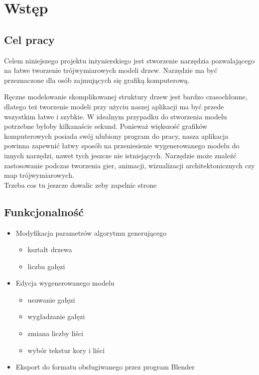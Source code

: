 \chapter{Wstęp}

\section{Cel pracy}
Celem niniejszego projektu inżynierskiego jest stworzenie narzędzia pozwalającego na łatwe 
tworzenie trójwymiarowych modeli drzew. Narzędzie ma być przeznaczone dla osób zajmujących
się grafiką komputerową.

Ręczne modelowanie skomplikowanej struktury drzew jest bardzo czasochłonne,
dlatego też tworzenie modeli przy użyciu naszej aplikacji ma być przede wszystkim łatwe i szybkie.
W idealnym przypadku do stworzenia modelu potrzebne byłoby kilkanaście sekund. Ponieważ większość
grafików komputerowych posiada swój ulubiony program do pracy, nasza aplikacja powinna zapewnić
łatwy sposób na przeniesienie wygenerowanego modelu do innych narzędzi, nawet tych jeszcze nie istniejących.
Narzędzie może znaleźć zastosowanie podczas tworzenia gier, animacji, wizualizacji architektonicznych
czy map trójwymiarowych.
\\
Trzeba cos tu jeszcze dowalic zeby zapelnic strone


\newpage
\section{Funkcjonalność}
\begin{itemize}
	\item{Modyfikacja parametrów algorytmu generującego}
	\begin{itemize}
		\item{kształt drzewa}
		\item{liczba gałęzi}
	\end{itemize}
	\item{Edycja wygenerowanego modelu}
	\begin{itemize}
		\item{usuwanie gałęzi}
		\item{wygładzanie gałęzi}
		\item{zmiana liczby liści}
		\item{wybór tekstur kory i liści}
	\end{itemize}

	\item{Eksport do formatu obsługiwanego przez program Blender}
\end{itemize}

